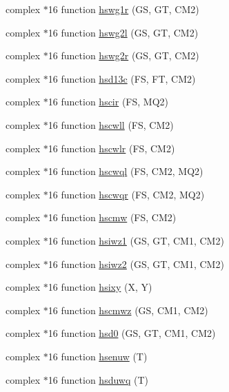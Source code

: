 \begin{DoxyCompactItemize}
\item 
complex $\ast$16 function \hyperlink{djangoh__h_8f_a140724e9bd330e35b9c31b8de6001edb}{hswg1r} (GS, GT, C\+M2)
\item 
complex $\ast$16 function \hyperlink{djangoh__h_8f_aed3bff6b346cd0f10035f970652aa814}{hswg2l} (GS, GT, C\+M2)
\item 
complex $\ast$16 function \hyperlink{djangoh__h_8f_af087ee5df2d895e3826c980f55875348}{hswg2r} (GS, GT, C\+M2)
\item 
complex $\ast$16 function \hyperlink{djangoh__h_8f_aa0bae3f3986d41ccddbbe729945c2b3d}{hsd13c} (FS, FT, C\+M2)
\item 
complex $\ast$16 function \hyperlink{djangoh__h_8f_ae2c9b96a23af92b724c02469ce20e760}{hscir} (FS, M\+Q2)
\item 
complex $\ast$16 function \hyperlink{djangoh__h_8f_a394d43e9f2d86e852f18e5c0763e65ea}{hscwll} (FS, C\+M2)
\item 
complex $\ast$16 function \hyperlink{djangoh__h_8f_aa1ed15a3dc1205d55ee3a8eeb774b5d5}{hscwlr} (FS, C\+M2)
\item 
complex $\ast$16 function \hyperlink{djangoh__h_8f_a5bbc131d71e97e7f06c2e867bec24eec}{hscwql} (FS, C\+M2, M\+Q2)
\item 
complex $\ast$16 function \hyperlink{djangoh__h_8f_a67a8dbf09bfd8e694c25a01bc0341653}{hscwqr} (FS, C\+M2, M\+Q2)
\item 
complex $\ast$16 function \hyperlink{djangoh__h_8f_acfe5dd7a43646e43089a6cd30cb273ce}{hscmw} (FS, C\+M2)
\item 
complex $\ast$16 function \hyperlink{djangoh__h_8f_a57c2acc216ca2579ebdaffd3f7250e69}{hsiwz1} (GS, GT, C\+M1, C\+M2)
\item 
complex $\ast$16 function \hyperlink{djangoh__h_8f_ae089808ec513a8d216f6d1be102aa46a}{hsiwz2} (GS, GT, C\+M1, C\+M2)
\item 
complex $\ast$16 function \hyperlink{djangoh__h_8f_a785f3d406148e0a234e6f6514b985e81}{hsixy} (X, Y)
\item 
complex $\ast$16 function \hyperlink{djangoh__h_8f_ade989e0ec937cb227223cfbdf763a19d}{hscmwz} (GS, C\+M1, C\+M2)
\item 
complex $\ast$16 function \hyperlink{djangoh__h_8f_a41bd52092a8cc07e147442227603457f}{hsd0} (GS, GT, C\+M1, C\+M2)
\item 
complex $\ast$16 function \hyperlink{djangoh__h_8f_a50aabf7c37bed0881be627fd865176af}{hsenuw} (T)
\item 
complex $\ast$16 function \hyperlink{djangoh__h_8f_a57691fd114f710060efd3c5ef1fc0a45}{hsduwq} (T)

\end{DoxyCompactItemize}
